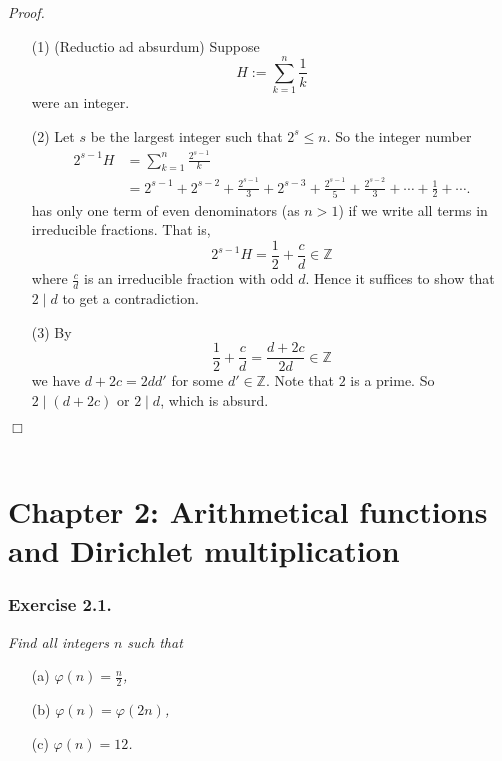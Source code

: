 \documentclass{article}
\begin{document}
\emph{Proof.}
\begin{enumerate}
\item[(1)]
  (Reductio ad absurdum)
  Suppose
  \[
    H := \sum_{k=1}^{n} \frac{1}{k}
  \]
  were an integer.

\item[(2)]
  Let $s$ be the largest integer such that $2^s \leq n$.
  So the integer number
  \begin{align*}
    2^{s-1} H
    &= \sum_{k=1}^{n} \frac{2^{s-1}}{k} \\
    &= 2^{s-1} + 2^{s-2} + \frac{2^{s-1}}{3} + 2^{s-3} + \frac{2^{s-1}}{5} + \frac{2^{s-2}}{3}
      + \cdots + \frac{1}{2} + \cdots.
  \end{align*}
  has only one term of even denominators (as $n > 1$)
  if we write all terms in irreducible fractions.
  That is,
  \[
  	2^{s-1} H = \frac{1}{2} + \frac{c}{d} \in \mathbb{Z}
  \]
  where $\frac{c}{d}$ is an irreducible fraction with odd $d$.
  Hence it suffices to show that $2 \mid d$ to get a contradiction.

\item[(3)]
  By
  \[
  	\frac{1}{2} + \frac{c}{d} = \frac{d + 2c}{2d} \in \mathbb{Z}
  \]
  we have $d + 2c = 2dd'$ for some $d' \in \mathbb{Z}$.
  Note that $2$ is a prime.
  So $2 \mid (d + 2c)$ or $2 \mid d$, which is absurd.
\end{enumerate}
$\Box$ \\\\






\newpage
\section*{Chapter 2: Arithmetical functions and Dirichlet multiplication \\}






\subsubsection*{Exercise 2.1.}
\emph{Find all integers $n$ such that}
\begin{enumerate}
\item[(a)]
  \emph{$\varphi(n) = \frac{n}{2}$,}

\item[(b)]
  \emph{$\varphi(n) = \varphi(2n)$,}

\item[(c)]
  \emph{$\varphi(n) = 12$.} \\
\end{enumerate}
\end{document}
